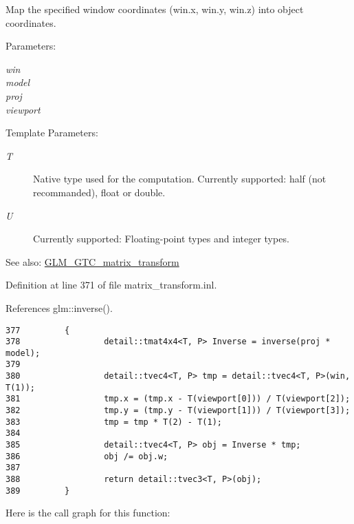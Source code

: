 Map the specified window coordinates (win.x, win.y, win.z) into object coordinates.

\begin{Desc}
\item[Parameters:]
\begin{description}
\item[{\em win}]\item[{\em model}]\item[{\em proj}]\item[{\em viewport}]\end{description}
\end{Desc}
\begin{Desc}
\item[Template Parameters:]
\begin{description}
\item[{\em T}]Native type used for the computation. Currently supported: half (not recommanded), float or double. \item[{\em U}]Currently supported: Floating-point types and integer types. \end{description}
\end{Desc}
\begin{Desc}
\item[See also:]\hyperlink{group__gtc__matrix__transform}{GLM\_\-GTC\_\-matrix\_\-transform} \end{Desc}


Definition at line 371 of file matrix\_\-transform.inl.

References glm::inverse().

\begin{Code}\begin{verbatim}377         {
378                 detail::tmat4x4<T, P> Inverse = inverse(proj * model);
379 
380                 detail::tvec4<T, P> tmp = detail::tvec4<T, P>(win, T(1));
381                 tmp.x = (tmp.x - T(viewport[0])) / T(viewport[2]);
382                 tmp.y = (tmp.y - T(viewport[1])) / T(viewport[3]);
383                 tmp = tmp * T(2) - T(1);
384 
385                 detail::tvec4<T, P> obj = Inverse * tmp;
386                 obj /= obj.w;
387 
388                 return detail::tvec3<T, P>(obj);
389         }
\end{verbatim}
\end{Code}




Here is the call graph for this function: